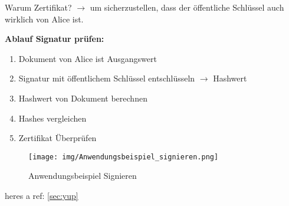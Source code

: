 \documentclass[12pt]{scrartcl}
\begin{document}
Warum Zertifikat? $\rightarrow$ um sicherzustellen, dass der öffentliche Schlüssel auch wirklich
von Alice ist.

\newpage
\textbf{Ablauf Signatur prüfen:}
\begin{enumerate}
    \item Dokument von Alice ist Ausgangswert
    \item Signatur mit öffentlichem Schlüssel entschlüsseln $\rightarrow$ Hashwert
    \item Hashwert von Dokument berechnen
    \item Hashes vergleichen
    \item Zertifikat Überprüfen
\end{enumerate}


\label{sec:yup}
\begin{figure}[ht]
    \centering
    \texttt{[image: img/Anwendungsbeispiel\_signieren.png]}
    \caption{Anwendungsbeispiel Signieren}
    \label{fig:your_label}
\end{figure}


heres a ref: \ref{sec:yup}








\end{document}
